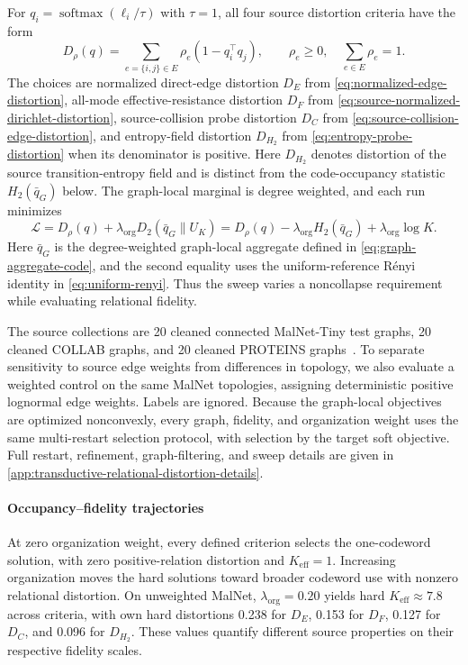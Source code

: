 For $q_i=\operatorname{softmax}(\ell_i/\tau)$ with $\tau=1$, all four source distortion criteria have the form
\begin{equation}
D_\rho(q)=\sum_{e=\{i,j\}\in E}\rho_e(1-q_i^\top q_j),\qquad
\rho_e\ge0,\quad\sum_{e\in E}\rho_e=1.
\label{eq:transductive-drho}
\end{equation}
The choices are normalized direct-edge distortion $D_E$ from \cref{eq:normalized-edge-distortion}, all-mode effective-resistance distortion $D_F$ from \cref{eq:source-normalized-dirichlet-distortion}, source-collision probe distortion $D_C$ from \cref{eq:source-collision-edge-distortion}, and entropy-field distortion $D_{H_2}$ from \cref{eq:entropy-probe-distortion} when its denominator is positive.
Here $D_{H_2}$ denotes distortion of the source transition-entropy field and is distinct from the code-occupancy statistic $H_2(\bar q_G)$ below.
The graph-local marginal is degree weighted, and each run minimizes
\begin{equation}
\mathcal L=D_\rho(q)+\lambda_{\mathrm{org}}D_2(\bar q_G\|U_K)
=D_\rho(q)-\lambda_{\mathrm{org}}H_2(\bar q_G)+\lambda_{\mathrm{org}}\log K.
\label{eq:transductive-relational-objective}
\end{equation}
Here $\bar q_G$ is the degree-weighted graph-local aggregate defined in \cref{eq:graph-aggregate-code}, and the second equality uses the uniform-reference R\'enyi identity in \cref{eq:uniform-renyi}.
Thus the sweep varies a noncollapse requirement while evaluating relational fidelity.

The source collections are 20 cleaned connected MalNet-Tiny test graphs, 20 cleaned COLLAB graphs, and 20 cleaned PROTEINS graphs~\citep{freitas2021large,morris2020tudataset,yanardag2015deep,borgwardt2005protein}.
To separate sensitivity to source edge weights from differences in topology, we also evaluate a weighted control on the same MalNet topologies, assigning deterministic positive lognormal edge weights.
Labels are ignored.
Because the graph-local objectives are optimized nonconvexly, every graph, fidelity, and organization weight uses the same multi-restart selection protocol, with selection by the target soft objective.
Full restart, refinement, graph-filtering, and sweep details are given in \ref{app:transductive-relational-distortion-details}.

\paragraph{Occupancy--fidelity trajectories}
At zero organization weight, every defined criterion selects the one-codeword solution, with zero positive-relation distortion and $K_{\mathrm{eff}}=1$.
Increasing organization moves the hard solutions toward broader codeword use with nonzero relational distortion.
On unweighted MalNet, $\lambda_{\mathrm{org}}=0.20$ yields hard $K_{\mathrm{eff}}\approx7.8$ across criteria, with own hard distortions 0.238 for $D_E$, 0.153 for $D_F$, 0.127 for $D_C$, and 0.096 for $D_{H_2}$.
These values quantify different source properties on their respective fidelity scales.

